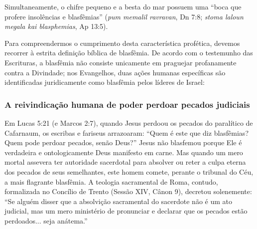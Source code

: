\documentclass[11pt,a4paper,openany]{book}
\begin{document}
Simultaneamente, o chifre pequeno e a besta do mar possuem uma ``boca que profere insolências e blasfêmias'' (\textit{pum memalil ravravan}, Dn 7:8; \textit{stoma laloun megala kai blasphemias}, Ap 13:5).

Para compreendermos o cumprimento desta característica profética, devemos recorrer à estrita definição bíblica de blasfêmia. De acordo com o testemunho das Escrituras, a blasfêmia não consiste unicamente em praguejar profanamente contra a Divindade; nos Evangelhos, duas ações humanas específicas são identificadas juridicamente como blasfêmia pelos líderes de Israel:


\subsubsection*{A reivindicação humana de poder perdoar pecados judiciais}
Em Lucas 5:21 (e Marcos 2:7), quando Jesus perdoou os pecados do paralítico de Cafarnaum, os escribas e fariseus arrazoaram: ``Quem é este que diz blasfêmias? Quem pode perdoar pecados, senão Deus?'' Jesus não blasfemou porque Ele é verdadeira e ontologicamente Deus manifesto em carne. Mas quando um mero mortal assevera ter autoridade sacerdotal para absolver ou reter a culpa eterna dos pecados de seus semelhantes, este homem comete, perante o tribunal do Céu, a mais flagrante blasfêmia. A teologia sacramental de Roma, contudo, formalizada no Concílio de Trento (Sessão XIV, Cânon 9), decretou solenemente: ``Se alguém disser que a absolvição sacramental do sacerdote não é um ato judicial, mas um mero ministério de pronunciar e declarar que os pecados estão perdoados... seja anátema.''
\end{document}
